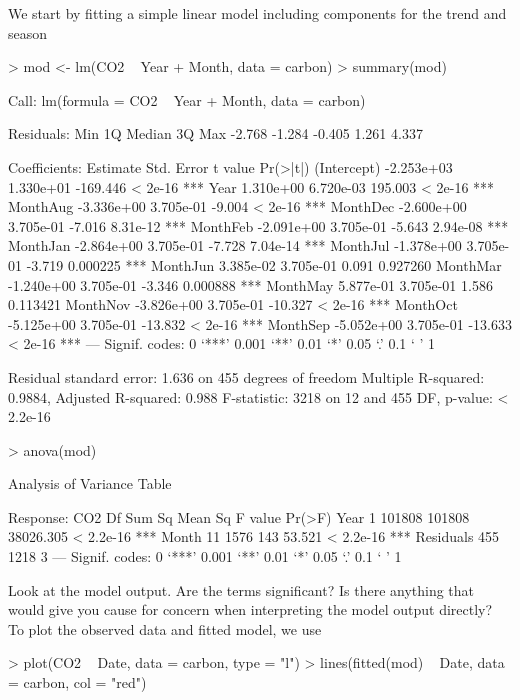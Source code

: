 \documentclass[a4paper,10pt]{article}
\begin{document}
We start by fitting a simple linear model including components for the trend and season
\begin{Schunk}
\begin{Sinput}
> mod <- lm(CO2 ~ Year + Month, data = carbon)
> summary(mod)
\end{Sinput}
\begin{Soutput}
Call:
lm(formula = CO2 ~ Year + Month, data = carbon)

Residuals:
   Min     1Q Median     3Q    Max 
-2.768 -1.284 -0.405  1.261  4.337 

Coefficients:
              Estimate Std. Error  t value Pr(>|t|)    
(Intercept) -2.253e+03  1.330e+01 -169.446  < 2e-16 ***
Year         1.310e+00  6.720e-03  195.003  < 2e-16 ***
MonthAug    -3.336e+00  3.705e-01   -9.004  < 2e-16 ***
MonthDec    -2.600e+00  3.705e-01   -7.016 8.31e-12 ***
MonthFeb    -2.091e+00  3.705e-01   -5.643 2.94e-08 ***
MonthJan    -2.864e+00  3.705e-01   -7.728 7.04e-14 ***
MonthJul    -1.378e+00  3.705e-01   -3.719 0.000225 ***
MonthJun     3.385e-02  3.705e-01    0.091 0.927260    
MonthMar    -1.240e+00  3.705e-01   -3.346 0.000888 ***
MonthMay     5.877e-01  3.705e-01    1.586 0.113421    
MonthNov    -3.826e+00  3.705e-01  -10.327  < 2e-16 ***
MonthOct    -5.125e+00  3.705e-01  -13.832  < 2e-16 ***
MonthSep    -5.052e+00  3.705e-01  -13.633  < 2e-16 ***
---
Signif. codes:  0 ‘***’ 0.001 ‘**’ 0.01 ‘*’ 0.05 ‘.’ 0.1 ‘ ’ 1

Residual standard error: 1.636 on 455 degrees of freedom
Multiple R-squared:  0.9884,	Adjusted R-squared:  0.988 
F-statistic:  3218 on 12 and 455 DF,  p-value: < 2.2e-16
\end{Soutput}
\begin{Sinput}
> anova(mod)
\end{Sinput}
\begin{Soutput}
Analysis of Variance Table

Response: CO2
           Df Sum Sq Mean Sq   F value    Pr(>F)    
Year        1 101808  101808 38026.305 < 2.2e-16 ***
Month      11   1576     143    53.521 < 2.2e-16 ***
Residuals 455   1218       3                        
---
Signif. codes:  0 ‘***’ 0.001 ‘**’ 0.01 ‘*’ 0.05 ‘.’ 0.1 ‘ ’ 1
\end{Soutput}
\end{Schunk}
Look at the model output. Are the terms significant? Is there anything that would give you cause for concern when interpreting the model output directly?
To plot the observed data and fitted model, we use
\begin{Schunk}
\begin{Sinput}
> plot(CO2 ~ Date, data = carbon, type = "l")
> lines(fitted(mod) ~ Date, data = carbon, col = "red")
\end{Sinput}
\end{Schunk}
\end{document}
